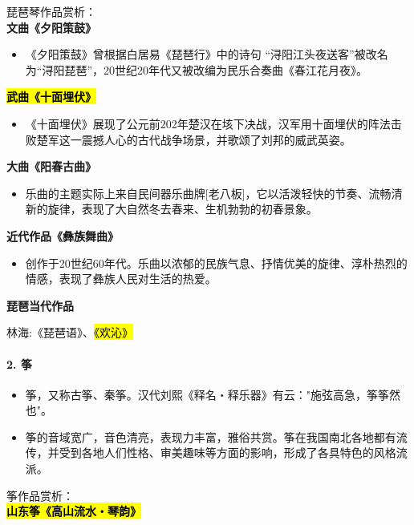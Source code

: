 \documentclass[
]{article}
\providecommand{\tightlist}{%
  \setlength{\itemsep}{0pt}\setlength{\parskip}{0pt}}
\begin{document}
琵琶琴作品赏析：\\
\textbf{文曲《夕阳策鼓》}

\begin{itemize}
\tightlist
\item
  《夕阳策鼓》曾根据白居易《琵琶行》中的诗句
  ``浔阳江头夜送客''被改名为``浔阳琵琶''，20世纪20年代又被改编为民乐合奏曲《春江花月夜》。
\end{itemize}

\hl{\mbox{\textbf{武曲《十面埋伏》}}}

\begin{itemize}
\tightlist
\item
  《十面埋伏》展现了公元前202年楚汉在垓下决战，汉军用十面埋伏的阵法击败楚军这一震撼人心的古代战争场景，并歌颂了刘邦的威武英姿。
\end{itemize}

\textbf{大曲《阳春古曲》}

\begin{itemize}
\tightlist
\item
  乐曲的主题实际上来自民间器乐曲牌{[}老八板{]}，它以活泼轻快的节奏、流畅清新的旋律，表现了大自然冬去春来、生机勃勃的初春景象。
\end{itemize}

\textbf{近代作品《彝族舞曲》}

\begin{itemize}
\tightlist
\item
  创作于20世纪60年代。乐曲以浓郁的民族气息、抒情优美的旋律、淳朴热烈的情感，表现了彝族人民对生活的热爱。
\end{itemize}

\textbf{琵琶当代作品}

林海:《琵琶语》、\hl{\mbox{《欢沁》}}

\paragraph{2. 筝}\label{ux7b5d}

\begin{itemize}
\tightlist
\item
  筝，又称古筝、秦筝。汉代刘熙《释名・释乐器》有云："施弦高急，筝筝然也"。
\item
  筝的音域宽广，音色清亮，表现力丰富，雅俗共赏。筝在我国南北各地都有流传，并受到各地人们性格、审美趣味等方面的影响，形成了各具特色的风格流派。
\end{itemize}

筝作品赏析：\\
\hl{\mbox{\textbf{山东筝《高山流水・琴韵》}}}
\end{document}
